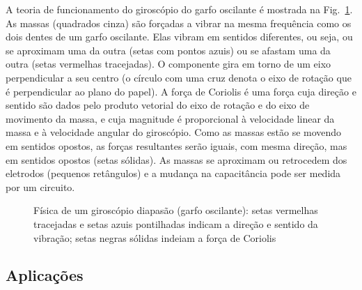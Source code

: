 A teoria de funcionamento do giroscópio do garfo oscilante é mostrada na Fig.~\ref{fig.tuning-gyro}. As massas (quadrados cinza) são forçadas a vibrar na mesma frequência como os dois dentes de um garfo oscilante. Elas vibram em sentidos diferentes, ou seja, ou se aproximam uma da outra (setas com pontos azuis) ou se afastam uma da outra (setas vermelhas tracejadas). O componente gira em torno de um eixo perpendicular a seu centro (o círculo com uma cruz denota o eixo de rotação que é perpendicular ao plano do papel). A força de Coriolis é uma força cuja direção e sentido são dados pelo produto vetorial do eixo de rotação e do eixo de movimento da massa, e cuja magnitude é proporcional à velocidade linear da massa e à velocidade angular do giroscópio. Como as massas estão se movendo em sentidos opostos, as forças resultantes serão iguais, com mesma direção, mas em sentidos opostos (setas sólidas). As massas se aproximam ou retrocedem dos eletrodos (pequenos retângulos) e a mudança na capacitância pode ser medida por um circuito.

\begin{figure}
\begin{center}
\end{center}
\caption{Física de um giroscópio diapasão (garfo oscilante): setas vermelhas tracejadas e setas azuis pontilhadas indicam a direção e sentido da vibração; setas negras sólidas indeiam a força de Coriolis}\label{fig.tuning-gyro}
\end{figure}

\subsection{Aplicações}

